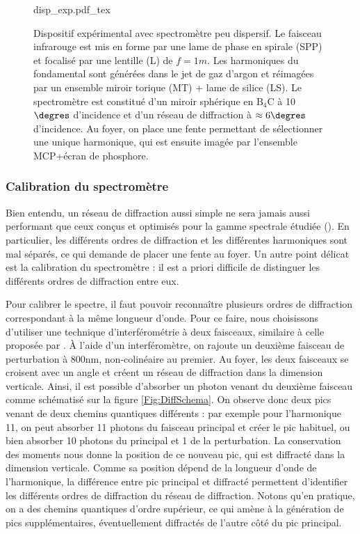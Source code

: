 \begin{figure}[!ht]
\centering
\def\svgwidth{\columnwidth}
{disp_exp.pdf_tex}
\caption{Dispositif expérimental avec spectromètre peu dispersif. Le faisceau infrarouge est mis en forme par une lame de phase en spirale (SPP) et focalisé par une lentille (L) de $f=1m$. Les harmoniques du fondamental sont générées dans le jet de gaz d'argon et réimagées par un ensemble miroir torique (MT) + lame de silice (LS). Le spectromètre est constitué d'un miroir sphérique en $\mathrm{B}_\mathrm{4}\mathrm{C}$ à 10$\degres$ d'incidence et d'un réseau de diffraction à $\approx 6\degres$ d'incidence. Au foyer, on place une fente permettant de sélectionner une unique harmonique, qui est ensuite imagée par l'ensemble MCP+écran de phosphore.}
\label{Fig:DispHartmut}
\end{figure}

\subsubsection{Calibration du spectromètre}
Bien entendu, un réseau de diffraction aussi simple ne sera jamais aussi performant que ceux conçus et optimisés pour la gamme spectrale étudiée (). En particulier, les différents ordres de diffraction et les différentes harmoniques sont mal séparés, ce qui demande de placer une fente au foyer. Un autre point délicat est la calibration du spectromètre : il est a priori difficile de distinguer les différents ordres de diffraction entre eux. 

Pour calibrer le spectre, il faut pouvoir reconnaître plusieurs ordres de diffraction correspondant à la même longueur d'onde. Pour ce faire, nous choisissons d'utiliser une technique d'interférométrie à deux faisceaux, similaire à celle proposée par . \`{A} l'aide d'un interféromètre, on rajoute un deuxième faisceau de perturbation à 800nm, non-colinéaire au premier. Au foyer, les deux faisceaux se croisent avec un angle et créent un réseau de diffraction dans la dimension verticale. Ainsi, il est possible d'absorber un photon venant du deuxième faisceau comme schématisé sur la figure \ref{Fig:DiffSchema}. On observe donc deux pics venant de deux chemins quantiques différents : par exemple pour l'harmonique 11, on peut absorber 11 photons du faisceau principal et créer le pic habituel, ou bien absorber 10 photons du principal et 1 de la perturbation. La conservation des moments nous donne la position de ce nouveau pic, qui est diffracté dans la dimension verticale. Comme sa position dépend de la longueur d'onde de l'harmonique, la différence entre pic principal et diffracté permettent d'identifier 
les différents ordres de diffraction du réseau de diffraction. Notons qu'en pratique, on a des chemins quantiques d'ordre supérieur, ce qui amène à la génération de pics supplémentaires, éventuellement diffractés de l'autre côté du pic principal.

